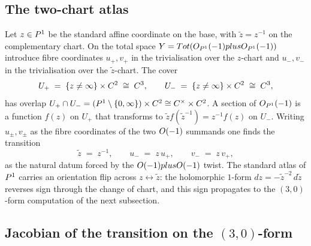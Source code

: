 \subsection{The two-chart atlas}

Let $z \in P^1$ be the standard affine coordinate on the base, with
$\tilde z = z^{-1}$ on the complementary chart.  On the total space
\(
  Y = Tot(O_{P^1}(-1) plus O_{P^1}(-1))
\)
introduce fibre coordinates $u_+, v_+$ in the trivialisation over the
$z$-chart and $u_-, v_-$ in the trivialisation over the $\tilde z$-chart.
The cover
\[
  U_+ \;=\; \{z \neq \infty\} \times C^2 \;\cong\; C^3,
  \qquad
  U_- \;=\; \{z \neq \infty\} \times C^2 \;\cong\; C^3,
\]
has overlap $U_+ \cap U_- = (P^1 \setminus \{0, \infty\}) \times C^2
\cong C^\times \times C^2$.  A section of $O_{P^1}(-1)$ is a function
$f(z)$ on $U_+$ that transforms to $\tilde z f(\tilde z^{-1}) = z^{-1} f(z)$
on $U_-$.  Writing $u_\pm, v_\pm$ as the fibre coordinates of the two $O(-1)$
summands one finds the transition
\begin{equation}\label{eq:conifold-transition-chart}
  \tilde z \;=\; z^{-1},
  \qquad
  u_- \;=\; z\, u_+,
  \qquad
  v_- \;=\; z\, v_+,
\end{equation}
as the natural datum forced by the $O(-1) plus O(-1)$ twist.  The
standard atlas of $P^1$ carries an orientation flip across
$z \leftrightarrow \tilde z$: the holomorphic $1$-form $dz = -\tilde z^{-2}\,
d\tilde z$ reverses sign through the change of chart, and this sign
propagates to the $(3,0)$-form computation of the next subsection.

\subsection{Jacobian of the transition on the $(3,0)$-form}

